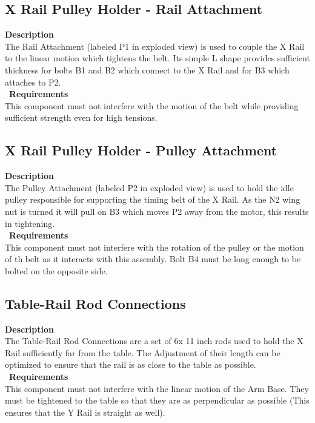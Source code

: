 \documentclass[titlepage]{article}
\begin{document}
\subsection{X Rail Pulley Holder - Rail Attachment}
\textbf{Description}\\
The Rail Attachment (labeled P1 in exploded view) is used to couple the X Rail to the linear motion which tightens the belt. Its simple L shape provides sufficient thickness for bolts B1 and B2 which connect to the X Rail and for B3 which attaches to P2. \\\
\textbf{Requirements}\\
This component must not interfere with the motion of the belt while providing sufficient strength even for high tensions.

\subsection{X Rail Pulley Holder - Pulley Attachment}
\textbf{Description}\\
The Pulley Attachment (labeled P2 in exploded view) is used to hold the idle pulley responsible for supporting the timing belt of the X Rail. As the N2 wing nut is turned it will pull on B3 which moves P2 away from the motor, this results in tightening.\\\
\textbf{Requirements}\\
This component must not interfere with the rotation of the pulley or the motion of th belt as it interacts with this assembly. Bolt B4 must be long enough to be bolted on the opposite side. 

\subsection{Table-Rail Rod Connections}
\textbf{Description}\\
The Table-Rail Rod Connections are a set of 6x 11 inch rods used to hold the X Rail sufficiently far from the table. The Adjustment of their length can be optimized to ensure that the rail is as close to the table as possible.\\\
\textbf{Requirements}\\
This component must not interfere with the linear motion of the Arm Base. They must be tightened to the table so that they are as perpendicular as possible (This ensures that the Y Rail is straight as well).
\end{document}
